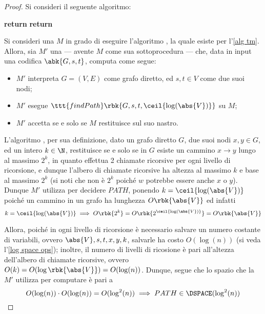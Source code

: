 \documentclass[a4paper, 12pt]{report}
\begin{document}
    \begin{proof}
        Si consideri il seguente algoritmo:

        \begin{algorithmic}[1]
                        \State \textbf{return} 
                    \Else
                        \State \textbf{return} 
                    \EndIf
                            \State {} 
                        \EndIf
                    \EndFor

                    \State {} 
                \EndIf
            \EndFunction
        \end{algorithmic}

        Si consideri una \TM $M$ in grado di eseguire l'algoritmo , la quale esiste per l'\cref{alg tm}. Allora, sia $M'$ una \TM --- avente $M$ come sua sottoprocedura --- che, data in input una codifica $\abk{G, s, t}$, computa come segue:

        \begin{itemize}
            \item $M'$ interpreta $G = (V, E)$ come grafo diretto, ed $s, t \in V$ come due suoi nodi;
            \item $M'$ esegue $\ttt{findPath}\rbk{G, s, t, \ceil{\log(\abs{V})}}$ su $M$;
            \item $M'$ accetta se e solo se $M$ restituisce  sul suo nastro.
        \end{itemize}

        L'algoritmo , per sua definizione, dato un grafo diretto $G$, due suoi nodi $x, y \in G$, ed un intero $k \in \N$, restituisce  se e solo se in $G$ esiste un cammino $x \to y$ lungo al massimo $2^k$, in quanto  effettua 2 chiamate ricorsive per ogni livello di ricorsione, e dunque l'albero di chiamate ricorsive ha altezza al massimo $k$ e base al massimo $2^k$ (si noti che non è  $2^k$ poiché $w$ potrebbe essere anche $x$ o $y$). Dunque $M'$ utilizza  per decidere $PATH$, ponendo $k = \ceil{\log(\abs{V})}$ poiché un cammino in un grafo ha lunghezza $O\rbk{\abs{V}}$ ed infatti $$k = \ceil{\log(\abs{V})} \implies O\rbk{2^k} = O\rbk{2^{\ceil{\log(\abs{V})}}} = O\rbk{\abs{V}}$$

        Allora, poiché in ogni livello di ricorsione è necessario salvare un numero costante di variabili, ovvero $\abs{V}, s, t, x, y, k$, salvarle ha costo $O(\log(n))$ (si veda l'\cref{log space ops}); inoltre, il numero di livelli di ricosione è pari all'altezza dell'albero di chiamate ricorsive, ovvero $O(k) = O(\log \rbk{\abs{V}}) = O(\log(n))$. Dunque, segue che lo spazio che la \TM $M'$ utilizza per computare è pari a $$O(\log(n)) \cdot O(\log(n)) = O(\log^2(n)) \implies PATH \in \DSPACE(\log^2(n))$$
    \end{proof}
\end{document}

